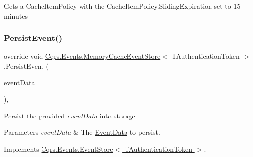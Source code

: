 Get\textquotesingle{}s a Cache\+Item\+Policy with the Cache\+Item\+Policy.\+Sliding\+Expiration set to 15 minutes 

\mbox{\label{classCqrs_1_1Events_1_1MemoryCacheEventStore_a9b1a1aaab34770bd68ebcedca0fc40b0_a9b1a1aaab34770bd68ebcedca0fc40b0}} 
\subsubsection{\texorpdfstring{Persist\+Event()}{PersistEvent()}}
{\footnotesize\ttfamily override void \hyperlink{classCqrs_1_1Events_1_1MemoryCacheEventStore}{Cqrs.\+Events.\+Memory\+Cache\+Event\+Store}$<$ T\+Authentication\+Token $>$.Persist\+Event (\begin{DoxyParamCaption}\item[{\hyperlink{classCqrs_1_1Events_1_1EventData}{Event\+Data}}]{event\+Data }\end{DoxyParamCaption})\hspace{0.3cm}{\ttfamily [protected]}, {\ttfamily [virtual]}}



Persist the provided {\itshape event\+Data}  into storage. 


\begin{DoxyParams}{Parameters}
{\em event\+Data} & The \hyperlink{classCqrs_1_1Events_1_1EventData}{Event\+Data} to persist.\\
\hline
\end{DoxyParams}


Implements \hyperlink{classCqrs_1_1Events_1_1EventStore_aedb71ca0ddf21220e323bc60ad7508cd_aedb71ca0ddf21220e323bc60ad7508cd}{Cqrs.\+Events.\+Event\+Store$<$ T\+Authentication\+Token $>$}.

\mbox{\label{classCqrs_1_1Events_1_1MemoryCacheEventStore_a4cac39acb87d9e25c4c090a384515d11_a4cac39acb87d9e25c4c090a384515d11}} 
